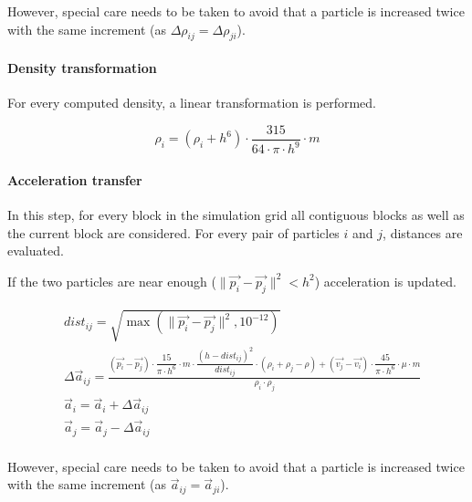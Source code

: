 However, special care needs to be taken to avoid that a particle is increased twice
with the same increment (as $\Delta \rho_{ij} = \Delta \rho_{ji}$).


\paragraph{Density transformation}
For every computed density, a linear transformation is performed.

\[
\rho_i = (\rho_i + h^6) \cdot \frac{315}{64 \cdot \pi \cdot h^9} \cdot m
\]

\paragraph{Acceleration transfer}
In this step, for every block in the simulation grid all contiguous blocks as
well as the current block are considered. For every pair of particles $i$ and
$j$, distances are evaluated.

If the two particles are near enough
($\|\vec{p_i} - \vec{p_j}\|^2 < h^2$) 
acceleration is updated.

\[
\begin{split}
& dist_{ij} = \sqrt{\max(\|\vec{p_i} - \vec{p_j}\|^2, 10^{-12})} \\
& \Delta \vec{a}_{ij} = 
  \frac{
    (\vec{p_i} - \vec{p_j}) \cdot \dfrac{15}{\pi \cdot h^6} \cdot m \cdot 
    \dfrac{(h - dist_{ij})^2}{dist_{ij}} \cdot (\rho_i + \rho_j - \rho) +
    (\vec{v_j} - \vec{v_i}) \cdot \dfrac{45}{\pi \cdot h^6} \cdot \mu \cdot m
  }{
    \rho_i \cdot \rho_j    
  } \\
& \vec{a}_i = \vec{a}_i + \Delta \vec{a}_{ij}\\
& \vec{a}_j = \vec{a}_j - \Delta \vec{a}_{ij}\\
\end{split}
\]

However, special care needs to be taken to avoid that a particle is increased twice
with the same increment (as $\vec{a}_{ij} = \vec{a}_{ji}$).
